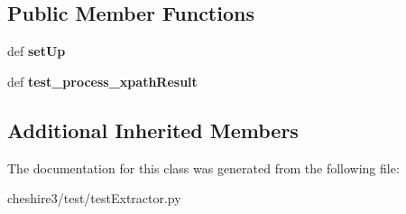 \subsection*{Public Member Functions}
\begin{DoxyCompactItemize}
\item 
\hypertarget{classcheshire3_1_1test_1_1test_extractor_1_1_span_x_path_extractor_test_case_ad5bdc2d04455989f5be64af53eb8368d}{def {\bfseries set\-Up}}\label{classcheshire3_1_1test_1_1test_extractor_1_1_span_x_path_extractor_test_case_ad5bdc2d04455989f5be64af53eb8368d}

\item 
\hypertarget{classcheshire3_1_1test_1_1test_extractor_1_1_span_x_path_extractor_test_case_a9bcf0b0d83ddf5cef2619b05176be053}{def {\bfseries test\-\_\-process\-\_\-xpath\-Result}}\label{classcheshire3_1_1test_1_1test_extractor_1_1_span_x_path_extractor_test_case_a9bcf0b0d83ddf5cef2619b05176be053}

\end{DoxyCompactItemize}
\subsection*{Additional Inherited Members}


The documentation for this class was generated from the following file\-:\begin{DoxyCompactItemize}
\item 
cheshire3/test/test\-Extractor.\-py\end{DoxyCompactItemize}
